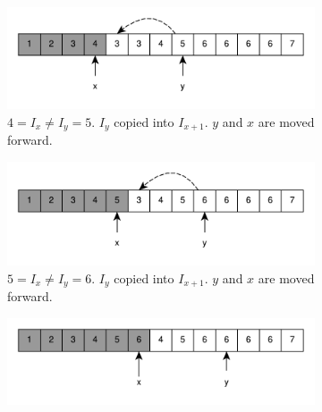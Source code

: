 \begin{figure}
\begin{subfigure}[t]{0.49\textwidth}
		\label{fig:remove_duplicated_sorted_array_inplace:example1_6}
	 \end{subfigure}
	 \hfill
	 \begin{subfigure}[t]{0.49\textwidth}
		\includegraphics[width=1\linewidth]{sources/remove_duplicated_sorted_array_inplace/images/example1_8}
		\vspace*{-8mm}
		\caption{$4 = I_x \neq I_y = 5$. $I_y$ copied into $I_{x+1}$. $y$ and $x$ are moved forward.}
		\label{fig:remove_duplicated_sorted_array_inplace:example1_6}
	 \end{subfigure}
	 \hfill
	 \begin{subfigure}[t]{0.49\textwidth}
		\includegraphics[width=1\linewidth]{sources/remove_duplicated_sorted_array_inplace/images/example1_10}
		\vspace*{-8mm}
		\caption{$5 = I_x \neq I_y = 6$. $I_y$ copied into $I_{x+1}$. $y$ and $x$ are moved forward.}
		\label{fig:remove_duplicated_sorted_array_inplace:example1_6}
	 \end{subfigure}
	 \hfill
	 \begin{subfigure}[t]{0.49\textwidth}
		\includegraphics[width=1\linewidth]{sources/remove_duplicated_sorted_array_inplace/images/example1_11}
		\vspace*{-8mm}

\end{subfigure}
\end{figure}
